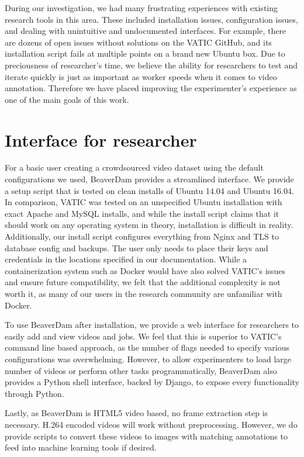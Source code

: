 
During our investigation, we had many frustrating experiences with existing research tools in this area.
These included installation issues, configuration issues, and dealing with unintuitive and undocumented interfaces.
For example, there are dozens of open issues without solutions on the VATIC GitHub,
and its installation script fails at multiple points on a brand new Ubuntu box.
Due to preciousness of researcher's time,
we believe the ability for researchers to test and iterate quickly is just as important as worker speeds when it comes to video annotation.
Therefore we have placed improving the experimenter's experience as one of the main goals of this work.

\section{Interface for researcher}

For a basic user creating a crowdsourced video dataset using the default configurations we used,
BeaverDam provides a streamlined interface.
We provide a setup script that is tested on clean installs of Ubuntu 14.04 and Ubuntu 16.04.
In comparison, VATIC was tested on an unspecified Ubuntu installation with exact Apache and MySQL installs,
and while the install script claims that it should work on any operating system in theory,
installation is difficult in reality.
Additionally, our install script configures everything from Nginx and TLS to database config and backups.
The user only needs to place their keys and credentials in the locations specified in our documentation.
While a containerization system such as Docker would have also solved VATIC's issues and ensure future compatibility,
we felt that the additional complexity is not worth it, as many of our users in the research community are unfamiliar with Docker.

To use BeaverDam after installation, we provide a web interface for researchers to easily add and view videos and jobs.
We feel that this is superior to VATIC's command line based approach,
as the number of flags needed to specify various configurations was overwhelming.
However, to allow experimenters to load large number of videos or perform other tasks programmatically,
BeaverDam also provides a Python shell interface, backed by Django, to expose every functionality through Python.

Lastly, as BeaverDam is HTML5 video based, no frame extraction step is necessary.
H.264 encoded videos will work without preprocessing.
However, we do provide scripts to convert these videos to images with matching annotations to feed into machine learning tools if desired.

